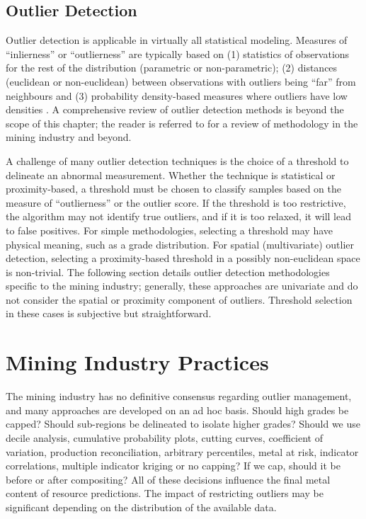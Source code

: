 \FloatBarrier
\subsection{Outlier Detection}
\label{subsec:02dectection}

Outlier detection is applicable in virtually all statistical modeling. Measures of ``inlierness'' or ``outlierness'' are typically based on (1) statistics of observations for the rest of the distribution (parametric or non-parametric); (2) distances (euclidean or non-euclidean) between observations with outliers being ``far'' from neighbours and (3) probability density-based measures where outliers have low densities \citep{li2022ecod}. A comprehensive review of outlier detection methods is beyond the scope of this chapter; the reader is referred to \cite{aggarwal2016outlier,pang2022deep,hodge2004survey,wang2019progress,nowak2019optimal,leuangthong2015dealing} for a review of methodology in the mining industry and beyond.

A challenge of many outlier detection techniques is the choice of a threshold to delineate an abnormal measurement. Whether the technique is statistical or proximity-based, a threshold must be chosen to classify samples based on the measure of ``outlierness'' or the outlier score. If the threshold is too restrictive, the algorithm may not identify true outliers, and if it is too relaxed, it will lead to false positives. For simple methodologies, selecting a threshold may have physical meaning, such as a grade distribution. For spatial (multivariate) outlier detection, selecting a proximity-based threshold in a possibly non-euclidean space is non-trivial. The following section details outlier detection methodologies specific to the mining industry; generally, these approaches are univariate and do not consider the spatial or proximity component of outliers. Threshold selection in these cases is subjective but straightforward.

\FloatBarrier
\section{Mining Industry Practices}
\label{sec:02industry}

The mining industry has no definitive consensus regarding outlier management, and many approaches are developed on an ad hoc basis. Should high grades be capped? Should sub-regions be delineated to isolate higher grades? Should we use decile analysis, cumulative probability plots, cutting curves, coefficient of variation, production reconciliation, arbitrary percentiles, metal at risk, indicator correlations, multiple indicator kriging or no capping? If we cap, should it be before or after compositing? All of these decisions influence the final metal content of resource predictions. The impact of restricting outliers may be significant depending on the distribution of the available data.

